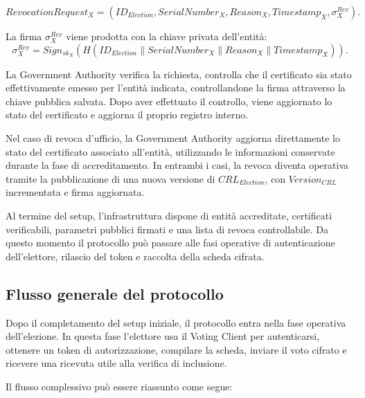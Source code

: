 \documentclass[a4paper,12pt]{article}
\begin{document}
\[
	RevocationRequest_X =
	(ID_{Election}, SerialNumber_X, Reason_X, Timestamp_X, \sigma_X^{Rev}).
\]

La firma \(\sigma_X^{Rev}\) viene prodotta con la chiave privata dell'entit\`a:
\[
	\sigma_X^{Rev} =
	Sign_{sk_X}(H(ID_{Election} \parallel SerialNumber_X \parallel Reason_X \parallel Timestamp_X)).
\]

La Government Authority verifica la richiesta, controlla che il certificato sia stato effettivamente emesso per l'entit\`a indicata, controllandone la firma attraverso la chiave pubblica salvata. Dopo aver effettuato il controllo, viene aggiornato lo stato del certificato e aggiorna il proprio registro interno.

Nel caso di revoca d'ufficio, la Government Authority aggiorna direttamente lo stato del certificato associato all'entit\`a, utilizzando le informazioni conservate durante la fase di accreditamento. 
In entrambi i casi, la revoca diventa operativa tramite la pubblicazione di una nuova versione di \(CRL_{Election}\), con \(Version_{CRL}\) incrementata e firma aggiornata.

Al termine del setup, l'infrastruttura dispone di entit\`a accreditate, certificati verificabili, parametri pubblici firmati e una lista di revoca controllabile. 
Da questo momento il protocollo pu\`o passare alle fasi operative di autenticazione dell'elettore, rilascio del token e raccolta della scheda cifrata.
\subsection{Flusso generale del protocollo}

Dopo il completamento del setup iniziale, il protocollo entra nella fase operativa dell'elezione. 
In questa fase l'elettore usa il Voting Client per autenticarsi, ottenere un token di autorizzazione, compilare la scheda, inviare il voto cifrato e ricevere una ricevuta utile alla verifica di inclusione.

Il flusso complessivo pu\`o essere riassunto come segue:
\end{document}
